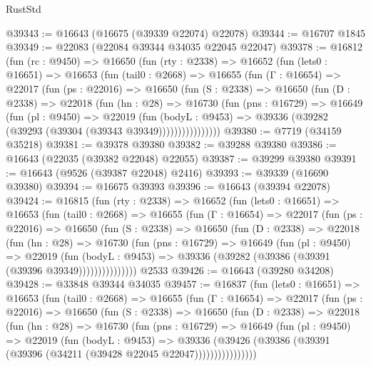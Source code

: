 \begin{lexlean}{RustStd}
\begin{coremodule}
@39343 := @16643 (@16675 (@39339 @22074) @22078)
@39344 := @16707 @1845
@39349 := @22083 (@22084 @39344 @34035 @22045 @22047)
@39378 := @16812
    (fun (rc : @9450) =>
    @16650
      (fun (rty : @2338) =>
      @16652
        (fun (lets0 : @16651) =>
        @16653
          (fun (tail0 : @2668) =>
          @16655
            (fun (Γ : @16654) =>
            @22017
              (fun (ps : @22016) =>
              @16650
                (fun (S : @2338) =>
                @16650
                  (fun (D : @2338) =>
                  @22018
                    (fun (hn : @28) =>
                    @16730
                      (fun (pns : @16729) =>
                      @16649
                        (fun (pl : @9450) =>
                        @22019
                          (fun (bodyL : @9453) =>
                          @39336 (@39282 (@39293 (@39304 (@39343 @39349))))))))))))))))
@39380 := @7719 (@34159 @35218)
@39381 := @39378 @39380
@39382 := @39288 @39380
@39386 := @16643 (@22035 (@39382 @22048) @22055)
@39387 := @39299 @39380
@39391 := @16643 (@9526 (@39387 @22048) @2416)
@39393 := @39339 (@16690 @39380)
@39394 := @16675 @39393
@39396 := @16643 (@39394 @22078)
@39424 := @16815
    (fun (rty : @2338) =>
    @16652
      (fun (lets0 : @16651) =>
      @16653
        (fun (tail0 : @2668) =>
        @16655
          (fun (Γ : @16654) =>
          @22017
            (fun (ps : @22016) =>
            @16650
              (fun (S : @2338) =>
              @16650
                (fun (D : @2338) =>
                @22018
                  (fun (hn : @28) =>
                  @16730
                    (fun (pns : @16729) =>
                    @16649
                      (fun (pl : @9450) =>
                      @22019
                        (fun (bodyL : @9453) =>
                        @39336 (@39282 (@39386 (@39391 (@39396 @39349)))))))))))))))
    @2533
@39426 := @16643 (@39280 @34208)
@39428 := @33848 @39344 @34035
@39457 := @16837
    (fun (lets0 : @16651) =>
    @16653
      (fun (tail0 : @2668) =>
      @16655
        (fun (Γ : @16654) =>
        @22017
          (fun (ps : @22016) =>
          @16650
            (fun (S : @2338) =>
            @16650
              (fun (D : @2338) =>
              @22018
                (fun (hn : @28) =>
                @16730
                  (fun (pns : @16729) =>
                  @16649
                    (fun (pl : @9450) =>
                    @22019
                      (fun (bodyL : @9453) =>
                      @39336
                        (@39426
                          (@39386 (@39391 (@39396 (@34211 (@39428 @22045 @22047))))))))))))))))

\end{coremodule}
\end{lexlean}
